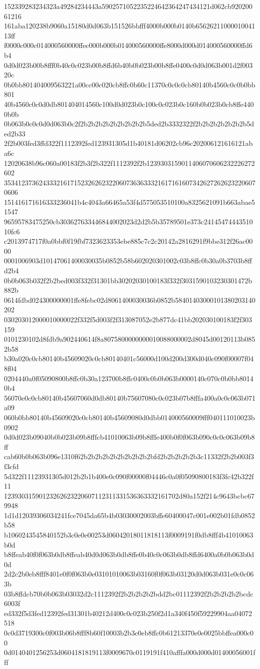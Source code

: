 152339283234323a49284234443a5902571052235224642364247434121d062cb92020061216
161aba120238b9060a15180d0d063b151526bbfff4000b000b0140b6562621100001004113ff
f0000c000c014000560000ffec000b000b014000560000ffe8000d000d014000560000ffd6b4
0d0d023b00b8fff0b40c0c023b00b8ffd6b40b0b023b00b8ffe0400c0d0d063b001d2f00320c
0b0bb801404009563221a00cc00c020cb8ffc0b60c11370c0c0c0cb80140b4560c0c0b0bb801
40b4560c0c0d0db801404014560c100d0d023b0c100c0c023b0c160b0b023b0cb8ffe4400b0b
0b063b0c0c0d0d063b0c2f2b2b2b2b2b2b2b2b2b5ded2b3332322f2b2b2b2b2b2b2b5ded2b33
2f2b003fed3ffd322f1112392fed123931305d1b40181d06202cb96c202006121616121aba6c
12020638b96c060a00183f2b3f2b322f1112392f2b1239303159011406070606232226272602
3534123736243332161715232626232206073636333216171616073426272626232206070606
151416171616333236041b4c4043a66465a53f4d575053510100a8325621091b663abae51547
96595783475250cb303627633446844002023d2d2b5b35789501e373c2414547444351010fc6
c2013974717f0a0bbf0f19fbf7323623353ebe885c7c2c20142a2816291f9bbe312f26ac0000
0001006903d10147061400030035b0852b58b602020301002c03b8ffc0b30a0b3703b8ffd2b4
0b0b063b032f2b2bed003f332f31301bb30202030100183f332f3031590103230301472b882b
0614fdbd024300000001ffe8febc02d8061400030036b0852b58401403000101380203140202
030203012000010000022f332f5d003f2f313087052e2b877dc41bb202030100183f2f303159
0101230102d8fdb9a902440614f8a8075800000000010088000002d8045d00120113b0852b58
b30a020c0cb80140b45609020c0cb80140401c56000d100d200d300d040c090f00007f048f04
0204440a0f05090800b8ffc0b30a123700b8ffc0400c0b0b063b0000140c070c0b0bb80140b4
56070e0c0cb80140b45607060d0db80140b75607080c0c023b07b8fffa400a0c0c063b071a09
060b0bb80140b45609020c0cb80140b45609080d0dbb014000560009fff040111010023b0902
0d0d023b09040b0b023b09b8fffcb41010063b09b8fffe400b0f0f063b090c0c0c063b09b8ff
cab60b0b063b096e1310f62b2b2b2b2b2b2b2b2b2bfd2b2b2b2b2b3c11332f2b2b003f3f3cfd
5d322f11123931305d012b2b1b400e0c090f00000f04446c0a0f05090800183f3fc42b322f11
12393031590123262623220607112311331536363332161702d80a152f214c9643bcbc679948
1d1d12039306034241fce7045da65b4b03030002003bffe60400047c001e002b01fdb0852b58
b1060243545840152b3c0e0e00253d06042018011818113f0009191f0db8fff4b41010063b0d
b8ffeab40f0f063b0db8ffeab40d0d063b0db8ffe0b40c0c063b0db8ffd6400a0b0b063b0d0d
2d2c2b0eb8fff8401e0f0f063b0e03101010063b03160f0f063b03120d0d063b031e0c0c063b
03b8ffdcb70b0b063b03032d2c1112392f2b2b2b2b2bdd2bc01112392f2b2b2b2b2bcdc6003f
ed332f5d3fed12392fed31301b40212d400c0c023b250f2d1a340f450f59229904aa04072518
0c0d3719300c0f003b06b8fff8b60f10003b2b3c0eb8ffc0b61213370e0e0025bbffea000c00
0d0140401256253d0604181819113f0009670c0119191f410afffa000d000d01400056001fff
